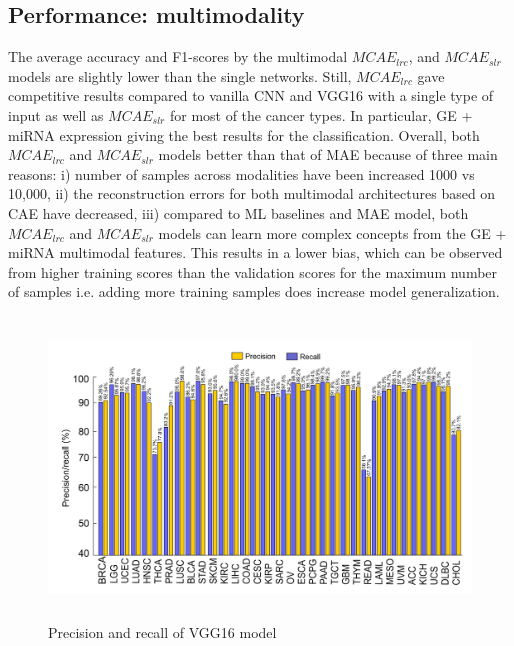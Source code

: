 \subsection{Performance: multimodality}
The average accuracy and F1-scores by the multimodal $MCAE_{lrc}$, and $MCAE_{slr}$ models are slightly lower than the single networks. Still, $MCAE_{lrc}$ gave competitive results compared to vanilla CNN and VGG16 with a single type of input as well as $MCAE_{slr}$ for most of the cancer types. 
In particular, GE + miRNA expression giving the best results for the classification.
Overall, both $MCAE_{lrc}$ and $MCAE_{slr}$ models better than that of MAE because of three main reasons: i) number of samples across modalities have been increased 1000 vs 10,000, ii) the reconstruction errors for both multimodal architectures based on CAE have decreased, iii) compared to ML baselines and MAE model, both $MCAE_{lrc}$ and $MCAE_{slr}$ models can learn more complex concepts from the GE + miRNA multimodal features. This results in a lower bias, which can be observed from higher training scores than the validation scores for the maximum number of samples i.e. adding more training samples does increase model generalization. 

\begin{figure}
\centering
	\includegraphics[width=0.85\linewidth,height=80mm]{images/pvr_value.png}
	\caption{Precision and recall of VGG16 model}
    \label{fig:pr_vgg16}
    \vspace{-4mm}
\end{figure}

